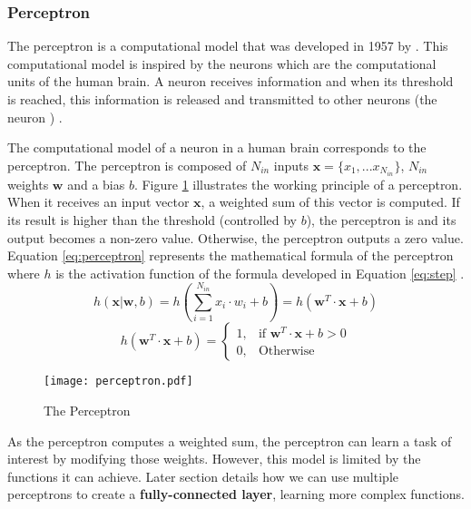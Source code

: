 \subsubsection{Perceptron} \label{subs:perceptron}
The perceptron is a computational model that was developed in 1957 by \textcite{rosenblatt_perceptron_1958}. This computational model is inspired by the neurons which are the computational units of the human brain. A neuron receives information and when its threshold is reached, this information is released and transmitted to other neurons (the neuron ) \cite{rosenblatt_perceptron_1958, matteucci_artificial_2019}.

The computational model of a neuron in a human brain corresponds to the perceptron. The perceptron is composed of $N_{in}$ inputs $\boldsymbol{x} = \{ x_1, ... x_{N_{in}} \}$, $N_{in}$ weights $\boldsymbol{w}$ and a bias $b$. Figure \ref{fig:perceptron} illustrates the working principle of a perceptron. When it receives an input vector $\boldsymbol{x}$, a weighted sum of this vector is computed. If its result is higher than the threshold (controlled by $b$), the perceptron is  and its output becomes a non-zero value. Otherwise, the perceptron outputs a zero value.
Equation \ref{eq:perceptron} represents the mathematical formula of the perceptron where $h$ is the activation function of the formula developed in Equation \ref{eq:step} \cite{matteucci_artificial_2019}.
%
\begin{equation}
    h ( \boldsymbol{x} | \boldsymbol{w}, b) = h \left( \sum^{N_{in}}_{i=1} x_i \cdot w_i + b \right) = h \left( \boldsymbol{w}^{T} \cdot \boldsymbol{x} + b \right)
    \label{eq:perceptron}
\end{equation}
%
\begin{equation}
    h ( \boldsymbol{w}^{T} \cdot \boldsymbol{x} + b) = \begin{cases} 1, & \mbox{if } \boldsymbol{w}^{T} \cdot \boldsymbol{x} + b > 0 \\ 0, & \mbox{Otherwise} \end{cases}
    \label{eq:step}
\end{equation}
%
\begin{figure}[H]
    \centering
    \texttt{[image: perceptron.pdf]}
    \caption{The Perceptron}
    \label{fig:perceptron}
\end{figure}
%
As the perceptron computes a weighted sum, the perceptron can learn a task of interest by modifying those weights. However, this model is limited by the functions it can achieve. Later section details how we can use multiple perceptrons to create a \textbf{fully-connected layer}, learning more complex functions.
